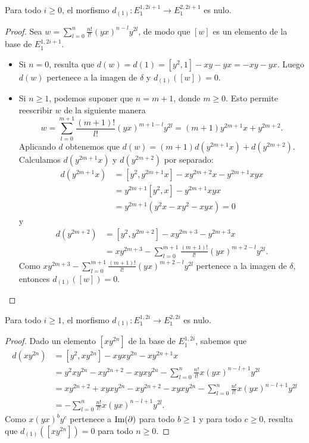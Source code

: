 \documentclass[fleqn,../tesis.tex]{subfiles}
\begin{document}
\begin{prop}
    Para todo $i \geq 0$, el morfismo $d_{(1)}: E^{1, 2i + 1}_{1} \to E^{2, 2i + 1}_{1}$ es nulo.
\end{prop}
\begin{proof}
Sea $w = \sum_{l = 0}^{n}\frac{n!}{l!}(yx)^{n - l}y^{2l}$, de modo que $[w]$ es un elemento de la base de $E^{1, 2i + 1}_{1}$.
\begin{itemize}
    \item Si $n = 0$, resulta que $d(w) = d(1) = \left[y^2, 1\right] - xy - yx = - xy - yx$. Luego $d(w)$ pertenece a la imagen de $\delta$ 
    y $d_{(1)}([w]) = 0$.
    \item Si $n \geq 1$, podemos suponer que $n = m + 1$, donde $m \geq 0$. Esto permite reescribir $w$ de la siguiente manera
    \[
        w = \sum_{l = 0}^{m + 1}\frac{(m + 1)!}{l!} (yx)^{m + 1 -l}y^{2l} = (m + 1)y^{2m + 1}x + y^{2m + 2}.
    \]
    Aplicando $d$ obtenemos que $d(w) = (m + 1)d\left(y^{2m + 1}x\right) + d\left(y^{2m + 2}\right)$.    
    Calculamos $d\left(y^{2m + 1}x\right)$ y $d\left(y^{2m + 2}\right)$ por separado:
    \begin{align*}
        d\left(y^{2m + 1}x\right) &= \left[y^{2}, y^{2m + 1}x\right] - xy^{2m + 2}x - y^{2m + 1}xyx \\
            &= y^{2m + 1}\left[y^{2}, x\right] - y^{2m + 1}xyx\\
        & = y^{2m + 1}\left(y^2x - xy^{2} - xyx\right) = 0
    \end{align*}
     y
     \begin{align*}
         d\left(y^{2m + 2}\right) &= \left[y^{2}, y^{2m + 2}\right] - xy^{2m + 3} - y^{2m + 3}x\\
         &= xy^{2m + 3} - \sum_{l =0}^{m + 1}\frac{(m + 1)!}{l!}(yx)^{m + 2 - l}y^{2l}.
     \end{align*}
     Como $xy^{2m + 3} - \sum_{l =0}^{m + 1}\frac{(m + 1)!}{l!}(yx)^{m + 2 - l}y^{2l}$ pertenece a la imagen de $\delta$,
     entonces $d_{(1)}([w]) = 0$.
\end{itemize}
\end{proof}


\begin{prop}
    Para todo $i \geq 1$, el morfismo $d_{(1)}: E^{1, 2i}_{1} \to E^{2, 2i}_{1}$ es nulo.
\end{prop}
\begin{proof}
Dado un elemento $\left[xy^{2n}\right]$ de la base de $E^{1, 2i}_{1}$, sabemos que
\begin{align*}
    d(xy^{2n}) &= \left[y^{2}, xy^{2n}\right] - xyxy^{2n} - xy^{2n + 1}x \\
    &= y^{2}xy^{2n} - xy^{2n + 2} - xyxy^{2n} - \sum_{l = 0}^{n}\frac{n!}{l!}x(yx)^{n - l + 1}y^{2l} \\
    &= xy^{2n + 2} + xyxy^{2n} - xy^{2n + 2} - xyxy^{2n} - \sum_{l = 0}^{n}\frac{n!}{l!}x(yx)^{n - l + 1}y^{2l} \\
    &= -\sum_{l = 0}^{n}\frac{n!}{l!}x(yx)^{n - l + 1}y^{2l}.
\end{align*}
Como $x(yx)^{b}y^{c}$ pertenece a $\operatorname{Im}(\partial)$ para todo $b \geq 1$ y para todo $c \geq 0$, resulta que
$d_{(1)}(\left[xy^{2n}\right]) = 0$ para todo $n \geq 0$.
\end{proof}
\end{document}

